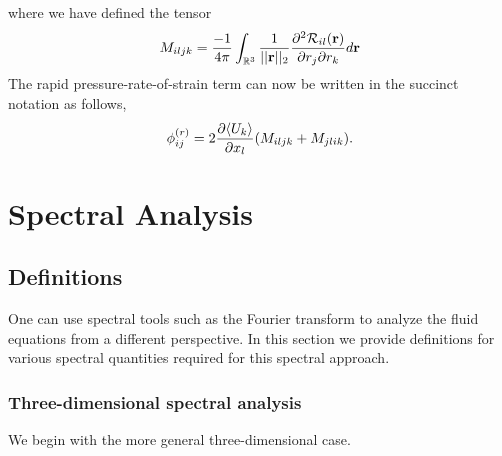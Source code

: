\documentclass[oneside,a4paper,11pt]{report}
\begin{document}
where we have defined the tensor 
\begin{equation}
M_{iljk} = \frac{-1}{4\pi}\int_{\mathbb{R}^3} \frac{1}{||\mathbf{r}||_2} \frac{\partial^2 \mathcal{R}_{il}(\mathbf{r})}{\partial r_j \partial r_k} d\mathbf{r} 
\end{equation}
The rapid pressure-rate-of-strain term can now be written in the succinct notation as follows,
\begin{equation}
\phi^{(r)}_{ij} = 2\frac{\partial \langle U_k \rangle}{\partial x_l} (M_{iljk} + M_{jlik}).
\end{equation}

%
\chapter{Spectral Analysis}
%

\section{Definitions}
One can use spectral tools such as the Fourier transform to analyze the fluid equations from a different perspective. In this section we provide definitions for various spectral quantities required for this spectral approach.

\subsection{Three-dimensional spectral analysis}
We begin with the more general three-dimensional case.
\end{document}
